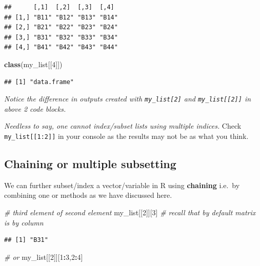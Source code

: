 \documentclass[
]{book}
\newenvironment{Shaded}{\begin{snugshade}}{\end{snugshade}}
\newcommand{\CommentTok}[1]{\textcolor[rgb]{0.56,0.35,0.01}{\textit{#1}}}
\newcommand{\DecValTok}[1]{\textcolor[rgb]{0.00,0.00,0.81}{#1}}
\newcommand{\FunctionTok}[1]{\textcolor[rgb]{0.13,0.29,0.53}{\textbf{#1}}}
\newcommand{\NormalTok}[1]{#1}
\newcommand{\SpecialCharTok}[1]{\textcolor[rgb]{0.81,0.36,0.00}{\textbf{#1}}}
\begin{document}
\begin{verbatim}
##      [,1]  [,2]  [,3]  [,4] 
## [1,] "B11" "B12" "B13" "B14"
## [2,] "B21" "B22" "B23" "B24"
## [3,] "B31" "B32" "B33" "B34"
## [4,] "B41" "B42" "B43" "B44"
\end{verbatim}

\begin{Shaded}
\begin{Highlighting}[]
\FunctionTok{class}\NormalTok{(my\_list[[}\DecValTok{4}\NormalTok{]])}
\end{Highlighting}
\end{Shaded}

\begin{verbatim}
## [1] "data.frame"
\end{verbatim}

\emph{Notice the difference in outputs created with \texttt{my\_list{[}2{]}} and \texttt{my\_list{[}{[}2{]}{]}} in above 2 code blocks.}

\emph{Needless to say, one cannot index/subset lists using multiple indices.} Check \texttt{my\_list{[}{[}1:2{]}{]}} in your console as the results may not be as what you think.

\hypertarget{chaining-or-multiple-subsetting}{%
\subsection{Chaining or multiple subsetting}\label{chaining-or-multiple-subsetting}}

We can further subset/index a vector/variable in R using \textbf{chaining} i.e.~by combining one or methods as we have discussed here.

\begin{Shaded}
\begin{Highlighting}[]
\CommentTok{\# third element of second element}
\NormalTok{my\_list[[}\DecValTok{2}\NormalTok{]][}\DecValTok{3}\NormalTok{] }\CommentTok{\# recall that by default matrix is by column}
\end{Highlighting}
\end{Shaded}

\begin{verbatim}
## [1] "B31"
\end{verbatim}

\begin{Shaded}
\begin{Highlighting}[]
\CommentTok{\# or}
\NormalTok{my\_list[[}\DecValTok{2}\NormalTok{]][}\DecValTok{1}\SpecialCharTok{:}\DecValTok{3}\NormalTok{,}\DecValTok{2}\SpecialCharTok{:}\DecValTok{4}\NormalTok{]}
\end{Highlighting}
\end{Shaded}
\end{document}
